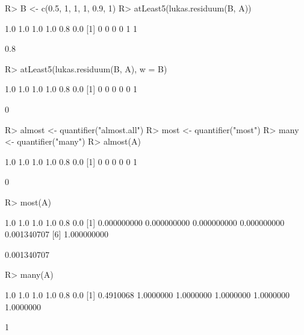 \documentclass{article}\usepackage[]{graphicx}\usepackage[]{color}
\begin{document}
\begin{Schunk}
% --begin: "quant3"
\begin{Sinput}
R> B <- c(0.5, 1, 1, 1, 0.9, 1)
R> atLeast5(lukas.residuum(B, A))
\end{Sinput}
\begin{Soutput}
[1] 1.0 1.0 1.0 1.0 0.8 0.0
[1] 0 0 0 0 1 1
\end{Soutput}
\begin{Soutput}
[1] 0.8
\end{Soutput}
%
% --end: "quant3"
\end{Schunk}

\begin{Schunk}
% --begin: "quant4"
\begin{Sinput}
R> atLeast5(lukas.residuum(B, A), w = B)
\end{Sinput}
\begin{Soutput}
[1] 1.0 1.0 1.0 1.0 0.8 0.0
[1] 0 0 0 0 0 1
\end{Soutput}
\begin{Soutput}
[1] 0
\end{Soutput}
%
% --end: "quant4"
\end{Schunk}

\begin{Schunk}
% --begin: "quant5"
\begin{Sinput}
R> almost <- quantifier("almost.all")
R> most <- quantifier("most")
R> many <- quantifier("many")
R> almost(A)
\end{Sinput}
\begin{Soutput}
[1] 1.0 1.0 1.0 1.0 0.8 0.0
[1] 0 0 0 0 0 1
\end{Soutput}
\begin{Soutput}
[1] 0
\end{Soutput}
\begin{Sinput}
R> most(A)
\end{Sinput}
\begin{Soutput}
[1] 1.0 1.0 1.0 1.0 0.8 0.0
[1] 0.000000000 0.000000000 0.000000000 0.000000000 0.001340707
[6] 1.000000000
\end{Soutput}
\begin{Soutput}
[1] 0.001340707
\end{Soutput}
\begin{Sinput}
R> many(A)
\end{Sinput}
\begin{Soutput}
[1] 1.0 1.0 1.0 1.0 0.8 0.0
[1] 0.4910068 1.0000000 1.0000000 1.0000000 1.0000000 1.0000000
\end{Soutput}
\begin{Soutput}
[1] 1
\end{Soutput}
%
% --end: "quant5"
\end{Schunk}
\end{document}
